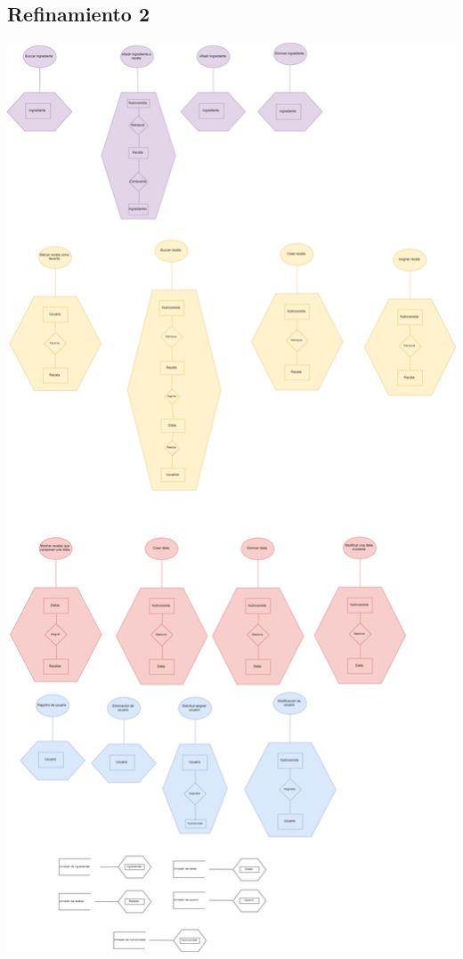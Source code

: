\documentclass[12pt,letterpaper]{article}
\begin{document}
\subsection{Refinamiento 2}
\includegraphics[scale=0.2]{externo2.png}
\end{document}
